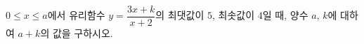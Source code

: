 $0\le x\le a$에서 유리함수 $y=\dfrac{3x+k}{x+2}$의 최댓값이 $5$, 최솟값이 $4$일 때, 양수 $a$, $k$에 대하여 $a+k$의 값을 구하시오. 
